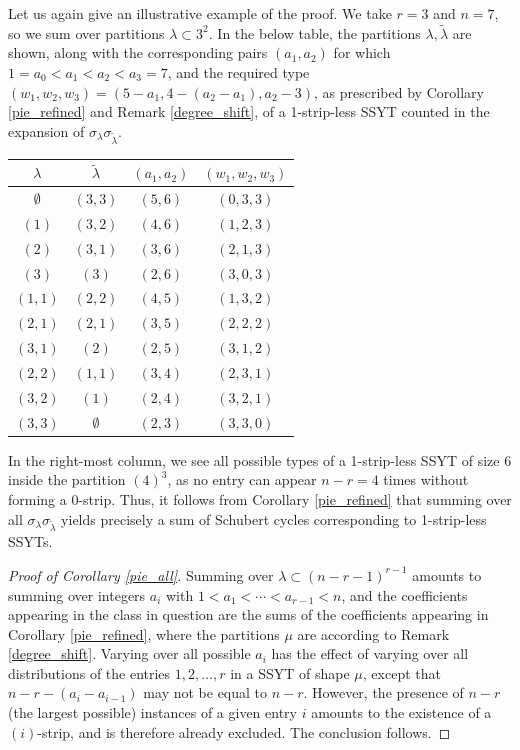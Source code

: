 Let us again give an illustrative example of the proof. We take $r=3$ and $n=7$, so we sum over partitions $\lambda\subset 3^2$. In the below table, the partitions $\lambda,\widetilde{\lambda}$ are shown, along with the corresponding pairs $(a_1,a_2)$ for which $1=a_0<a_1<a_2<a_3=7$, and the required type $(w_1,w_2,w_3)=(5-a_1,4-(a_2-a_1),a_2-3)$, as prescribed by Corollary \ref{pie_refined} and Remark \ref{degree_shift}, of a 1-strip-less SSYT counted in the expansion of $\sigma_{\lambda}\sigma_{\widetilde{\lambda}}$. 
\begin{center}
\begin{tabular}{ c | c | c | c }
$\lambda$ & $\widetilde{\lambda}$ & $(a_1,a_2)$ & $(w_1,w_2,w_3)$ \\
\hline
$\emptyset$ & $(3,3)$ & $(5,6)$ & $(0,3,3)$ \\
$(1)$ & $(3,2)$ & $(4,6)$ & $(1,2,3)$\\
$(2)$ & $(3,1)$ & $(3,6)$ & $(2,1,3)$\\
$(3)$ & $(3)$ & $(2,6)$ & $(3,0,3)$\\
$(1,1)$ & $(2,2)$ & $(4,5)$ & $(1,3,2)$\\ 
$(2,1)$ & $(2,1)$ & $(3,5)$ & $(2,2,2)$\\
$(3,1)$ & $(2)$ & $(2,5)$ & $(3,1,2)$\\
$(2,2)$ & $(1,1)$ & $(3,4)$ & $(2,3,1)$\\
$(3,2)$ & $(1)$ & $(2,4)$ & $(3,2,1)$\\
$(3,3)$ & $\emptyset$ & $(2,3)$ & $(3,3,0)$
\end{tabular}
\end{center}

In the right-most column, we see all possible types of a 1-strip-less SSYT of size 6 inside the partition $(4)^3$, as no entry can appear $n-r=4$ times without forming a $0$-strip. Thus, it follows from Corollary \ref{pie_refined} that summing over all $\sigma_{\lambda}\sigma_{\widetilde{\lambda}}$ yields precisely a sum of Schubert cycles corresponding to 1-strip-less SSYTs.

\begin{proof}[Proof of Corollary \ref{pie_all}]
Summing over $\lambda\subset(n-r-1)^{r-1}$ amounts to summing over integers $a_i$ with $1<a_1<\cdots<a_{r-1}<n$, and the coefficients appearing in the class in question are the sums of the coefficients appearing in Corollary \ref{pie_refined}, where the partitions $\mu$ are according to Remark \ref{degree_shift}. Varying over all possible $a_i$ has the effect of varying over all distributions of the entries $1,2,\ldots,r$ in a SSYT of shape $\mu$, except that $n-r-(a_{i}-a_{i-1})$ may not be equal to $n-r$. However, the presence of $n-r$ (the largest possible) instances of a given entry $i$ amounts to the existence of a $(i)$-strip, and is therefore already excluded. The conclusion follows.
\end{proof}

